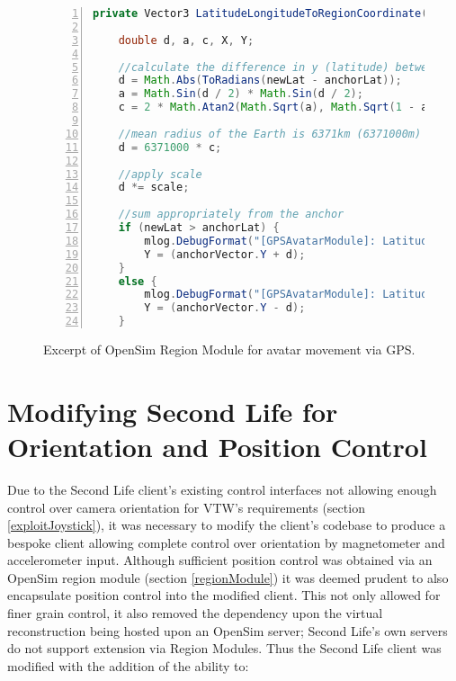 \begin{figure}[h]
\begin{lstlisting}[language=Java, numbers=left, numberstyle=\small, stepnumber=1, frame=single, breaklines=true, backgroundcolor=\color{codebackground}, showstringspaces=false]
private Vector3 LatitudeLongitudeToRegionCoordinate(double newLat, double newLong, double anchorLat, double anchorLong, Vector3 anchorVector, double scale) {

    double d, a, c, X, Y;

    //calculate the difference in y (latitude) between the anchor & the new reading
    d = Math.Abs(ToRadians(newLat - anchorLat));
    a = Math.Sin(d / 2) * Math.Sin(d / 2);
    c = 2 * Math.Atan2(Math.Sqrt(a), Math.Sqrt(1 - a));

    //mean radius of the Earth is 6371km (6371000m)
    d = 6371000 * c;

    //apply scale
    d *= scale;

    //sum appropriately from the anchor
    if (newLat > anchorLat) {
        mlog.DebugFormat("[GPSAvatarModule]: LatitudeLongitudeToRegionCoordinate() - (Y) newLat > anchorLat.");
        Y = (anchorVector.Y + d);
    }
    else {
        mlog.DebugFormat("[GPSAvatarModule]: LatitudeLongitudeToRegionCoordinate() - (Y) newLat < anchorLat.");
        Y = (anchorVector.Y - d);
    }
\end{lstlisting}
\caption{Excerpt of OpenSim Region Module for avatar movement via GPS.}
\label{RegionModuleCode1}
\end{figure}




\section{Modifying Second Life for Orientation and Position Control}

Due to the Second Life client's existing control interfaces not allowing enough control over camera orientation for VTW's requirements (section \ref{exploitJoystick}), it was necessary to modify the client's codebase to produce a bespoke client allowing complete control over orientation by magnetometer and accelerometer input. Although sufficient position control was obtained via an OpenSim region module (section \ref{regionModule}) it was deemed prudent to also encapsulate position control into the modified client. This not only allowed for finer grain control, it also removed the dependency upon the virtual reconstruction being hosted upon an OpenSim server; Second Life's own servers do not support extension via Region Modules. Thus the Second Life client was modified with the addition of the ability to:

